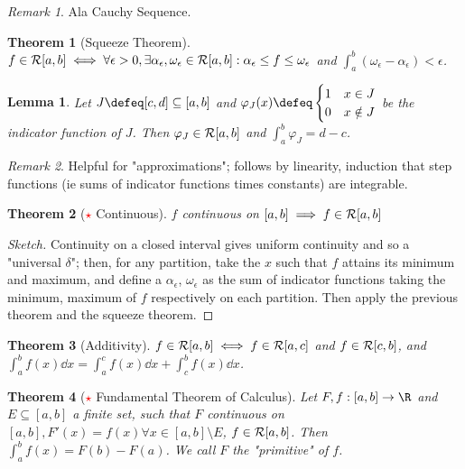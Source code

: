 \documentclass[12pt, oneside]{article}
\theoremstyle{definition}
\theoremstyle{plain}
\newtheorem{thm}{Theorem}
\newtheorem{lemma}{Lemma}
\theoremstyle{remark}
\newtheorem{remark}{Remark}
\begin{document}
\begin{remark}
  Ala Cauchy Sequence.
\end{remark}

\begin{thm}[Squeeze Theorem]
  $f \in \mathcal{R}[a, b] \iff \forall \epsilon > 0, \exists \alpha_\epsilon, \omega_\epsilon \in \mathcal{R}[a,b] : \alpha_\epsilon \leq f \leq \omega_\epsilon$ and $\int_a^b (\omega_\epsilon - \alpha_\epsilon) < \epsilon$.
\end{thm}

\begin{lemma}
  Let $J \defeq [c, d] \subseteq [a, b]$ and $\varphi_J(x) \defeq \begin{cases}
    1 & x \in J\\
    0 & x \notin J
  \end{cases}$ be the indicator function of $J$. Then $\varphi_J \in \mathcal{R}[a, b]$ and $\int_a^b \varphi_J = d- c$.
\end{lemma}

\begin{remark}
  Helpful for "approximations"; follows by linearity, induction that step functions (ie sums of indicator functions times constants) are integrable.
\end{remark}

\begin{thm}[\textcolor{red}{$\star$} Continuous]
  $f$ continuous on $[a, b] \implies f \in \mathcal{R}[a, b]$
\end{thm}

\begin{proof}[Sketch]
  Continuity on a closed interval gives uniform continuity and so a "universal $\delta$"; then, for any partition, take the $x$ such that $f$ attains its minimum and maximum, and define a $\alpha_\epsilon$, $\omega_\epsilon$ as the sum of indicator functions taking the minimum, maximum of $f$ respectively on each partition. Then apply the previous theorem and the squeeze theorem.
\end{proof}

\begin{thm}[Additivity]
  $f \in \mathcal{R}[a, b] \iff f \in \mathcal{R}[a, c]$ and $f \in \mathcal{R}[c, b]$, and $\int_a^b f(x) \dd{x} = \int_a^c f(x) \dd{x} + \int_c^b f(x) \dd{x}$.
\end{thm}

\begin{thm}[\textcolor{red}{$\star$} Fundamental Theorem of Calculus]
  Let $F, f : [a, b] \to \R$ and $E \subseteq [a, b]$ a finite set, such that $F$ continuous on $[a, b], F'(x) = f(x) \forall x \in [a, b] \setminus E$, $f \in \mathcal{R}[a, b]$. Then $\int_a^b f(x) = F(b) - F(a)$. We call $F$ the "primitive" of $f$.
\end{thm}
\end{document}
